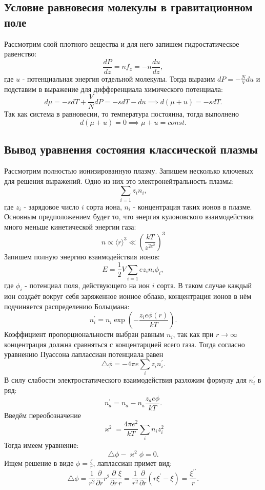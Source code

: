 \documentclass[12pt]{article}
\begin{document}
\subsection*{Условие равновесия молекулы в гравитационном поле} \label{app:2}
Рассмотрим слой плотного вещества и для него запишем гидростатическое равенство: 
\[
    \frac{dP}{dz} = n f_z = -n \frac{du}{dz},
\]
где $u$ - потенциальная энергия отдельной молекулы.  
Тогда выразим $dP = -\frac{N}{V} du$ и подставим в выражение для дифференциала химического потенциала: 
\[
    d \mu = -s dT + \frac{V}{N} dP = -s dT - du \implies d (\mu + u) = -s dT. 
\]   
Так как система в равновесии, то температура постоянна, тогда выполнено 
\[
    d(\mu + u) = 0 \implies \mu + u = const.
\]
\subsection*{Вывод уравнения состояния классической плазмы} \label{app:3}
Рассмотрим полностью ионизированную плазму. Запишем несколько ключевых для решения выражений. 
Одно из них это электронейтральность плазмы: 
\[
    \sum_{i=1} z_i n_i, 
\]
где $z_i$ - зарядовое число $i$ сорта иона, $n_i$ - концентрация таких ионов в плазме. 
Основным предположением будет то, что энергия кулоновского взаимодействия много меньше кинетической энергии газа: 
\[
    n \propto \langle r \rangle^3 \ll \left( \frac{kT}{z^{2e^2} } \right)^3
\]
Запишем полную энергию взаимодействия ионов: 
\[
    E = \frac{1}{2} V \sum_{i=1} e z_i n_i \phi_i, 
\]
где $\phi_i$ - потенциал поля, действующего на ион $i$ сорта. 
В таком случае каждый ион создаёт вокруг себя заряженное ионное облако, 
концентрация ионов в нём подчиняется распределению Больцмана: 
\[
    n_i^{\prime} = n_i \exp \left( -\frac{z_i e \phi(r)}{kT} \right). 
\]
Коэффициент пропорциональности выбран равным $n_i$, так как при $r \to \infty$ концентрация должна сравняться 
с концентарцией всего газа. 
Тогда согласно уравнению Пуассона лаплассиан потенциала равен 
\[
    \triangle \phi = - 4\pi e \sum_{i} z_i n_i^{\prime}.
\]
В силу слабости электростатического взаимодействия разложим формулу для $n_i^{\prime}$ в ряд: 
\[
    n_a^{\prime} = n_a - n_a \frac{z_a e \phi}{kT}.
\] 
Введём переобозначение
\[
    \varkappa^2 = \frac{4\pi e^2}{kT} \sum_{i} n_i z_i^2
\] 
Тогда имеем уравнение: 
\[
    \triangle \phi - \varkappa^2 \phi = 0. 
\]
Ищем решение в виде $\phi = \frac{\xi}{r}$, лаплассиан примет вид: 
\[
    \triangle \phi = \frac{1}{r^2} \frac{\partial}{\partial r} r^2 \frac{\partial}{\partial r} \frac{\xi}{r} = \frac{1}{r^2} \frac{\partial}{\partial r} (r \xi^{\prime} - \xi) = \frac{\xi^{\prime\prime}}{r}. 
\] 
\end{document}

